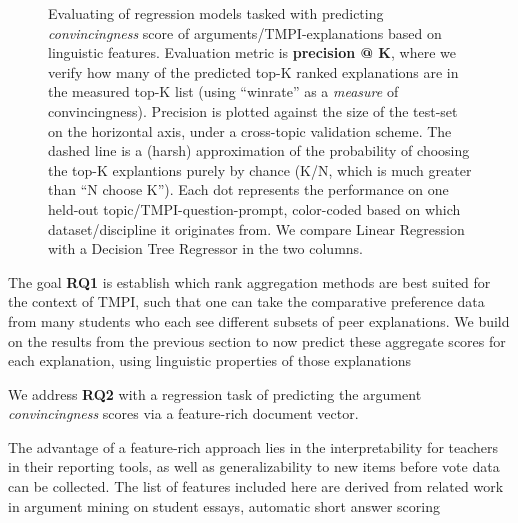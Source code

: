 \documentclass[notitlepage,12pt]{jedm}
\begin{document}
\begin{figure}
	\scalebox{0.5}{}
	\caption{
		Evaluating of regression models tasked with predicting 
		\textit{convincingness} score of arguments/TMPI-explanations based on 
		linguistic features.
		Evaluation metric is \textbf{precision @ K}, where we verify how many 
		of the predicted top-K ranked explanations are in the measured top-K 
		list (using ``winrate'' as a \textit{measure} of convincingness). 
		Precision is plotted against the size of the test-set on the horizontal 
		axis, under a cross-topic validation scheme.
		The dashed line is a (harsh) approximation of the probability of 
		choosing the top-K explantions purely by chance (K/N, which is much 
		greater than ``N choose K'').
		Each dot represents the performance on one held-out 
		topic/TMPI-question-prompt, color-coded based on which 
		dataset/discipline it originates from.
		We compare Linear Regression with a Decision Tree Regressor in the two 
		columns.
	}
	\label{fig:prec_at_K}
\end{figure}

The goal \textbf{RQ1} is establish which rank aggregation methods are best 
suited for the context of TMPI, such that one can take the comparative 
preference data from many students who each see different subsets of peer 
explanations.
We build on the results from the previous section to now predict these 
aggregate scores for each explanation, using 
linguistic properties of those explanations



We address \textbf{RQ2} with a regression task of predicting the argument 
\textit{convincingness} scores via a feature-rich document vector.


The advantage of a feature-rich approach lies in the interpretability for 
teachers in their reporting tools, as well as generalizability to new items 
before vote data can be collected.
The list of features included here are derived from related work in argument 
mining \cite{habernal_which_2016}\cite{persing_end--end_2016}on student essays, 
automatic short answer scoring \cite{mohler_text--text_2009}
\end{document}
